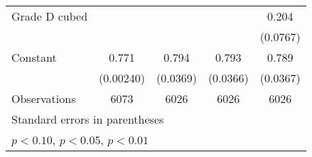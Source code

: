 {\begin{tabular}{l*{4}{c}}
\addlinespace
Grade D cubed       &                     &                     &                     &       0.204\sym{***}\\
                    &                     &                     &                     &    (0.0767)         \\
\addlinespace
Constant            &       0.771\sym{***}&       0.794\sym{***}&       0.793\sym{***}&       0.789\sym{***}\\
                    &   (0.00240)         &    (0.0369)         &    (0.0366)         &    (0.0367)         \\
\midrule
Observations        &        6073         &        6026         &        6026         &        6026         \\
\bottomrule
\multicolumn{5}{l}{\footnotesize Standard errors in parentheses}\\
\multicolumn{5}{l}{\footnotesize \sym{*} \(p<0.10\), \sym{**} \(p<0.05\), \sym{***} \(p<0.01\)}\\
\end{tabular}
}
